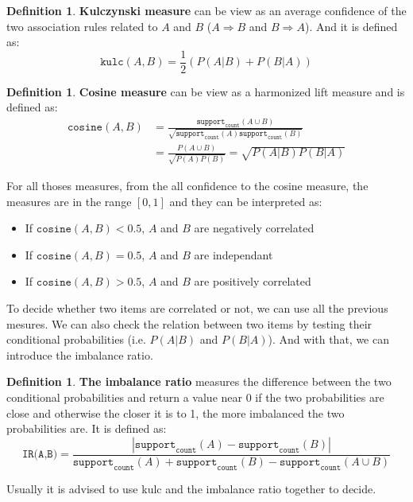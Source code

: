 \documentclass[12pt, openany]{report}
\theoremstyle{definition}
\newtheorem{definition}[thm]{Definition}
\begin{document}
\begin{definition}
    \textbf{Kulczynski measure} can be view as an average confidence of the two association rules related to $A$ and $B$ ($A \Rightarrow B$ and $B \Rightarrow A$). And it is defined as:
    \begin{equation}
        \texttt{kulc}(A,B) = \frac{1}{2} \left( P(A|B) + P(B|A) \right)
    \end{equation}
\end{definition}
\begin{definition}
    \textbf{Cosine measure} can be view as a harmonized lift measure and is defined as:
    \begin{equation}
        \begin{aligned}
            \texttt{cosine}(A,B) &= \frac{\texttt{support}_\texttt{count}(A \cup B)}{\sqrt{\texttt{support}_\texttt{count}(A) \texttt{support}_\texttt{count}(B) }}\\
            &= \frac{P(A \cup B)}{\sqrt{P(A) P(B)}} = \sqrt{P(A|B)P(B|A)} 
        \end{aligned}
    \end{equation}
\end{definition}
For all thoses measures, from the all confidence to the cosine measure, the measures are in the range $[0,1]$ and they can be interpreted as:
\begin{itemize}
    \item If $\texttt{cosine}(A,B) < 0.5$, $A$ and $B$ are negatively correlated
    \item If $\texttt{cosine}(A,B) = 0.5$, $A$ and $B$ are independant
    \item If $\texttt{cosine}(A,B)> 0.5$, $A$ and $B$ are positively correlated
\end{itemize}
To decide whether two items are correlated or not, we can use all the previous mesures. We can also check the relation between two items by testing their conditional probabilities (i.e. $P(A|B)$ and $P(B|A)$). And with that, we can introduce the imbalance ratio.
\begin{definition}
    \textbf{The imbalance ratio} measures the difference between the two conditional probabilities and return a value near 0 if the two probabilities are close and otherwise the closer it is to 1, the more imbalanced the two probabilities are. It is defined as:
    \begin{equation}
        \texttt{IR(A,B)} = \frac{|\texttt{support}_\texttt{count}(A) - \texttt{support}_\texttt{count} (B) |}{\texttt{support}_\texttt{count}(A) + \texttt{support}_\texttt{count}(B) - \texttt{support}_\texttt{count}(A \cup B)}
    \end{equation}
\end{definition}
Usually it is advised to use kulc and the imbalance ratio together to decide.
\end{document}
